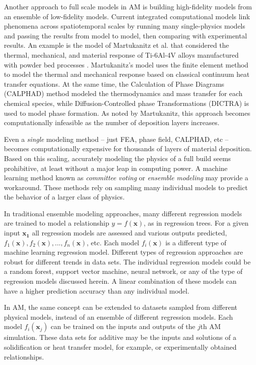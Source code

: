 Another approach to full scale models in AM is building high-fidelity models from an ensemble of low-fidelity models. Current integrated computational models link phenomena across spatiotemporal scales by running many single-physics models and passing the results from model to model, then comparing with experimental results. An example is the model of Martukanitz et al. that considered the thermal, mechanical, and material response of Ti-6Al-4V alloys manufactured with powder bed processes \cite{Martukanitz2014}. Martukanitz's model uses the finite element method to model the thermal and mechanical response based on classical continuum heat transfer equations. At the same time, the Calculation of Phase Diagrams (CALPHAD) method modeled the thermodynamics and mass transfer for each chemical species, while Diffusion-Controlled phase Transformations (DICTRA) is used to model phase formation. As noted by Martukanitz, this approach becomes computationally infeasible as the number of deposition layers increases.

Even a \textit{single} modeling method -- just FEA, phase field, CALPHAD, etc -- becomes computationally expensive for thousands of layers of material deposition. Based on this scaling, accurately modeling the physics of a full build seems prohibitive, at least without a major leap in computing power. A machine learning method known as \textit{committee voting} or \textit{ensemble modeling} may provide a workaround. These methods rely on sampling many individual models to predict the behavior of a larger class of physics.

In traditional ensemble modeling approaches, many different regression models are trained to model a relationship $y = f(\mathbf{x})$, as in regression trees. For a given input $\mathbf{x_1}$ all regression models are assessed and various outputs predicted, $f_1(\mathbf{x}), f_2(\mathbf{x}), ..., f_n(\mathbf{x})$, etc. Each model $f_i(\mathbf{x})$ is a different type of machine learning regression model. Different types of regression approaches are robust for different trends in data sets. The individual regression models could be a random forest, support vector machine, neural network, or any of the type of regression models discussed herein. A linear combination of these models can have a higher prediction accuracy than any individual model.

In AM, the same concept can be extended to datasets sampled from different physical models, instead of an ensemble of different regression models. Each model $f_i(\mathbf{x}_j)$ can be trained on the inputs and outputs of the $j$th AM simulation. These data sets for additive may be the inputs and solutions of a solidification or heat transfer model, for example, or experimentally obtained relationships.

